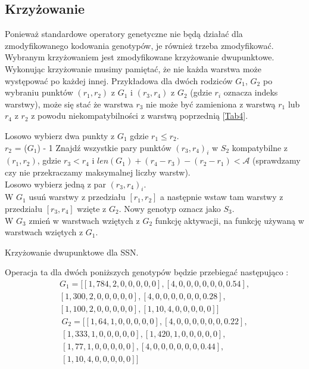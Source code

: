 \documentclass{article}
\begin{document}
\subsection{Krzyżowanie}
Ponieważ standardowe operatory genetyczne nie będą działać dla zmodyfikowanego kodowania
genotypów, je również trzeba zmodyfikować. Wybranym krzyżowaniem jest zmodyfikowane krzyżowanie
dwupunktowe. Wykonując krzyżowanie musimy pamiętać, że nie każda warstwa może występować po 
każdej innej. Przykładowa dla dwóch rodziców $G_1$, $G_2$ po wybraniu punktów $(r_1, r_2)$ z 
$G_1$ i $(r_3, r_4)$ z $G_2$ (gdzie $r_i$ oznacza indeks warstwy), może się stać że warstwa
$r_3$ nie może być zamieniona z warstwą $r_1$ lub $r_4$ z $r_2$ z powodu niekompatybilności
z warstwą poprzednią [\hyperref[tab:rules]{Tab4}].\\
\begin{algorithm}[H]
	Losowo wybierz dwa punkty z $G_1$ gdzie $r_1 \leq r_2$.\\
	 {
		$r_2$ = ($G_1$) - 1
	}
	Znajdź wszystkie pary punktów $(r_3, r_4)_i$ w $S_2$ kompatybilne z $(r_1, r_2)$,
	gdzie $r_3 < r_4$ i $len(G_1) + (r_4 - r_3) - (r_2 - r_1) < \mathcal{A}$
	(sprawdzamy czy nie przekraczamy maksymalnej liczby warstw).\\
	Losowo wybierz jedną z par $(r_3, r_4)_i$.\\
	W $G_1$ usuń warstwy z przedziału $[r_1, r_2]$ a następnie wstaw tam
	warstwy z przedziału $[r_3, r_4]$ wzięte z $G_2$. Nowy genotyp oznacz jako $S_3$.\\
	W $G_3$ zmień w warstwach wziętych z $G_2$ funkcję aktywacji, na funkcję 
	używaną w warstwach wziętych z  $G_1$.
	\caption{Krzyżowanie dwupunktowe dla SSN.}
\end{algorithm}
Operacja ta dla dwóch poniższych genotypów będzie przebiegać następująco \cite{ams}:\\
\begin{align*}
	G_1 = \big[[1, 784, 2, 0, 0, 0, 0, 0], [4, 0, 0, 0, 0, 0, 0, 0.54],\\ 
	            [1, 300, 2, 0, 0, 0, 0, 0], [4, 0, 0, 0, 0, 0, 0, 0.28],\\
		    [1, 100, 2, 0, 0, 0, 0, 0], [1, 10, 4, 0, 0, 0, 0, 0]\big]
\end{align*}
\begin{align*}
	G_2 = \big[[1, 64, 1, 0, 0, 0, 0, 0], [4, 0, 0, 0, 0, 0, 0, 0.22],\\
		    [1, 333, 1, 0, 0, 0, 0, 0], [1, 420, 1, 0, 0, 0, 0, 0],\\
		    [1, 77, 1, 0, 0, 0, 0, 0], [4, 0, 0, 0, 0, 0, 0, 0.44],\\
		    [1, 10, 4, 0, 0, 0, 0, 0]\big]
\end{align*}
\end{document}
